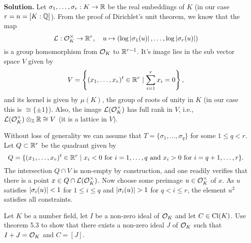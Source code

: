 \documentclass[a4paper,11pt]{article}
\begin{document}
\textbf{Solution.} 
Let $\sigma_1, \dots, \sigma_r: K \to \mathbb{R}$
be the real embeddings of $K$ (in our case $r = n = [K : \mathbb{Q}]$). 
From the proof of Dirichlet's unit theorem, we know that the map
\begin{equation*}
    \mathcal{L}: \mathcal{O}_K^\times \to \mathbb{R}^{r}, \quad u \mapsto (\log \left\lvert \sigma_1(u) \right\rvert, \dots, \log \left\lvert \sigma_r(u) \right\rvert)
\end{equation*}
is a group homomorphism from $\mathcal{O}_K$ to $\mathbb{R}^{r-1}$. It's image lies in the sub vector
space $V$ given by 
\begin{equation*}
    V = \left\{(x_1, \dots, x_r)^t \in \mathbb{R}^r \mid \sum_{i = 1}^r x_i = 0\right\},
\end{equation*}
and its kernel is given by $\mu(K)$, the group of roots of unity in $K$ (in our case this
is $\cong \{\pm 1\}$). Also, the image $\mathcal{L}(\mathcal{O}_K^\times)$ has full rank in 
$V$, i.e., $\mathcal{L}(\mathcal{O}_K^\times) \otimes_{\mathbb{Z}} \mathbb{R} \cong V$ (it is a lattice in $V$). 

Without loss of generality we can assume that 
$T = \{\sigma_1, \dots, \sigma_q\}$ for some $1 \leq q < r$. Let $Q \subset
\mathbb{R}^r$ be the quadrant given by
\begin{equation*}
    Q = \{(x_1, \dots, x_r)^t \in \mathbb{R}^r \mid x_i < 0 \text{ for }i = 1, \dots, q
    \text{ and }x_i > 0 \text{ for } i = q+1, \dots, r \}.
\end{equation*}
The intersection $Q \cap V$ is non-empty by construction, and one readily verifies that
there is a point $x \in Q \cap \mathcal{L}(\mathcal{O}_K^\times)$. Now choose some preimage
$u \in \mathcal{O}_K^\times$ of $x$. As $u$ satisfies $\left\lvert \sigma_i(u) \right\rvert < 1$ for 
$1 \leq i \leq q$ and $\left\lvert \sigma_i(u) \right\rvert > 1$ for $q < i \leq r$,
the element $u^2$ satisfies all constraints.

Let $K$ be a number field, let $I$ be a non-zero ideal of $\mathcal{O}_K$ and let $C \in \operatorname{Cl}(K)$. Use
theorem 5.3 to show that there exists a non-zero ideal $J$ of $\mathcal{O}_K$ such that $I + J = \mathcal{O}_K$ and
$C = [J]$. 

\contactend
\end{document}
